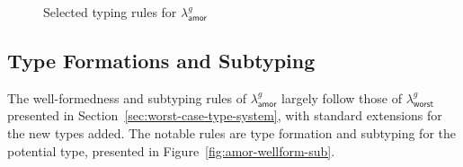 \begin{figure}[H]
\caption{Selected typing rules for $\lambda^g_{\mathsf{amor}}$}
\label{fig:amor-typing-rules}
\end{figure}

\subsection{Type Formations and Subtyping}
The well-formedness and subtyping rules of $\lambda^g_{\mathsf{amor}}$ largely follow those of $\lambda^g_{\mathsf{worst}}$ presented in Section~\ref{sec:worst-case-type-system},
with standard extensions for the new types added. 
The notable rules are type formation and subtyping for the potential type, presented in Figure~\ref{fig:amor-wellform-sub}.

